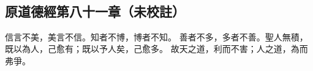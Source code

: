﻿%
%

\chapter{~}

\section{原道德經第八十一章（未校註）}

\begin{withgezhu}

\zhsong


信言不美，美言不信。\textcolor{tongjia-color}{知者不博，博者不知}。
善者不多，多者不善。聖人無積，既以為人，己愈有；既以予人矣，己愈多。
故天之道，利而不害；人之道，為而弗爭。

\end{withgezhu}
